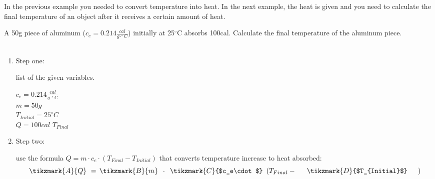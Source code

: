 \documentclass[main.tex]{subfiles}
\begin{document}
\begin{description}
In the previous example you needed to convert temperature into heat. In the next example, the heat is given and you need to calculate the final temperature of an object after it receives a certain amount of heat.
\begin{example} %
A 50g piece of aluminum ($c_e=0.214\frac{cal}{g\cdot^{\circ}C}$) initially at 25$^{\circ}$C absorbs 100cal. Calculate the final temperature of the aluminum piece.\\
\\
\begin{enumerate}[label=\protect\circled{\color{white}\arabic*}]
\item \begin{bf}Step one:\end{bf} list of the given variables.
\begin{tcbitemize}[raster columns=3, raster rows=3, enhanced, sharp corners, raster equal height=rows, raster force size=false, raster column skip=0pt, raster row skip = 0pt]
\tcbitem[blankest, width=1cm]
\tcbitem[header = helpful]
\texta
\tcbitem[header = harmful]
\textb
\tcbitem[firstcol = internal]
\textcn
\tcbitem[swotbox = G]
$c_e=0.214\frac{cal}{g\cdot^{\circ}C}$\\
$m=50g$\\
$T_{Initial}=25^{\circ}C$\\
$Q=100cal$
\tcbitem[swotbox = A]
$T_{Final}$\\
\end{tcbitemize}%
\item \begin{bf}Step two:\end{bf} use the formula $Q=m\cdot c_e\cdot  (T_{Final}-T_{Initial})$ that converts temperature increase to heat absorbed:
\vspace{10mm} \begin{equation*}
     \tikzmark{A}{Q}\,\,= \, \tikzmark{B}{m}\,\,\,\cdot \,\,\, \tikzmark{C}{$c_e\cdot$}\,\,\,  (T_{Final}-\,\,\,\,\,\,\,\,\,\tikzmark{D}{$T_{Initial}$}\,\,\,\,\,\,\,\,\,)
\end{equation*}
\end{enumerate}
\end{example}
\end{description}
\end{document}
